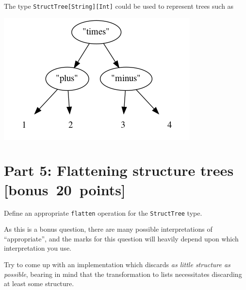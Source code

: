 \documentclass[11pt]{article}
\begin{document}
The type \texttt{StructTree[String][Int]} could be used
to represent trees such as
\begin{center}
\includegraphics[width=\textwidth]{media/StructTree.png}
\end{center}

\section*{Part 5: Flattening structure trees   [bonus 20 points]}
\label{sec:org22e2c78}
Define an appropriate \texttt{flatten} operation for the \texttt{StructTree} type.

As this is a bonus question, there are many possible
interpretations of “appropriate”, and the marks for this question
will heavily depend upon which interpretation you use.

Try to come up with an implementation
which discards \emph{as little structure as possible},
bearing in mind that the transformation to lists
necessitates discarding at least some structure.
\end{document}
